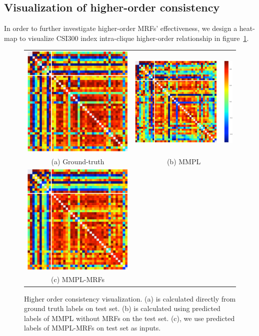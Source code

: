 \subsection{Visualization of higher-order consistency}

In order to further investigate higher-order MRFs' effectiveness,
we design a heat-map to visualize CSI300 index intra-clique
higher-order relationship in figure~\ref{fig:consistency}.

\begin{figure}[t]
  \centering
  \setlength{\tabcolsep}{20pt}
  \begin{tabular}{cc}
  \includegraphics[width=0.4\columnwidth]{Part2/figures/gt.png}&
\includegraphics[width=0.48\columnwidth]{Part2/figures/mmpl.png}\\
{\small (a) Ground-truth} & {\small (b) MMPL }\\
    \includegraphics[width=0.4\columnwidth]{Part2/figures/mrf.png}\\
{\small (c) MMPL-MRFs}\\
  \end{tabular}
  \caption{\label{fig:consistency} Higher order consistency
    visualization. (a) is calculated
    directly from ground truth labels on test set.
    (b)
    is calculated using predicted labels of MMPL without MRFs on the
    test set.
    (c), we use predicted labels of
    MMPL-MRFs on test set as inputs.}
\end{figure}


